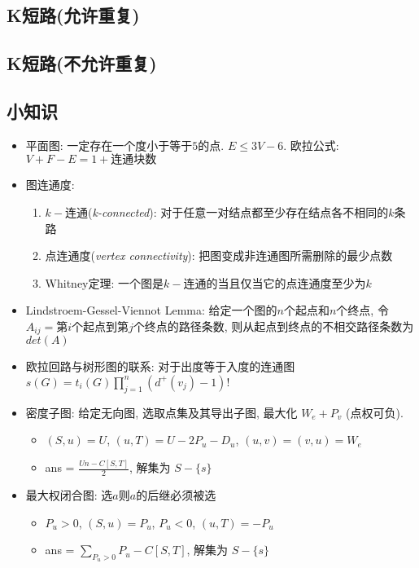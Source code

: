 \documentclass[landscape, twocolumn, 8pt, a4paper, twoside]{extarticle}
\begin{document}
\begin{spacing}{0.1}
\subsection{K短路(允许重复)}


\subsection{K短路(不允许重复)}


\subsection{小知识}
\begin{itemize}
\item 平面图: 一定存在一个度小于等于$5$的点. $E \le 3V - 6$. 欧拉公式: $V + F - E = 1 + \mbox{连通块数}$
\item 图连通度: 
  \begin{enumerate}
  \item $k-$连通(\emph{k-connected}): 对于任意一对结点都至少存在结点各不相同的$k$条路
  \item 点连通度(\emph{vertex connectivity}): 把图变成非连通图所需删除的最少点数
  \item Whitney定理: 一个图是$k-$连通的当且仅当它的点连通度至少为$k$
  \end{enumerate}
\item Lindstroem-Gessel-Viennot Lemma:
  给定一个图的$n$个起点和$n$个终点, 
  令$A_{ij} = $第$i$个起点到第$j$个终点的路径条数,
  则从起点到终点的不相交路径条数为 $det(A)$
\item 欧拉回路与树形图的联系: 
  对于出度等于入度的连通图
  $s(G) = t_i(G) \prod_{j = 1}^{n} (d^+(v_j) - 1)! $
\item 密度子图: 给定无向图, 选取点集及其导出子图, 最大化 $W_e + P_v$ (点权可负).
  \begin{itemize}
  \item $(S, u) = U$, $(u, T) = U - 2 P_u - D_u$, $(u, v) = (v, u) = W_e$
  \item ans = $\frac{Un - C[S, T]}{2}$, 解集为 $S - \{s\}$
  \end{itemize}
\item 最大权闭合图: 选$a$则$a$的后继必须被选
  \begin{itemize}
  \item $P_u > 0$, $(S, u) = P_u$, $P_u < 0$, $(u, T) = -P_u$
  \item ans = $\sum\limits_{P_u > 0}^{} P_u - C[S, T]$, 解集为 $S - \{s\}$

\end{itemize}
\end{itemize}
\end{spacing}
\end{document}

